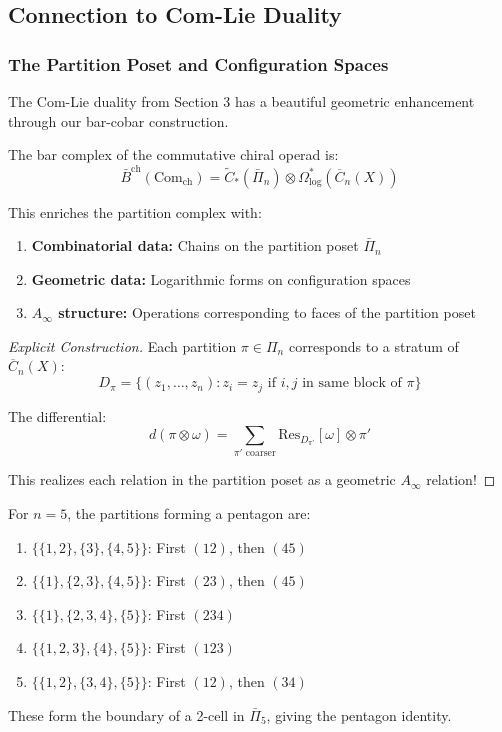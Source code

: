 \subsection{Connection to Com-Lie Duality}

\subsubsection{The Partition Poset and Configuration Spaces}

The Com-Lie duality from Section 3 has a beautiful geometric enhancement through our bar-cobar construction.

\begin{theorem}
The bar complex of the commutative chiral operad is:
$$\bar{B}^{\text{ch}}(\text{Com}_{\text{ch}}) = \tilde{C}_*(\bar{\Pi}_n) \otimes \Omega^*_{\text{log}}(\overline{C}_n(X))$$

This enriches the partition complex with:
\begin{enumerate}
\item \textbf{Combinatorial data:} Chains on the partition poset $\bar{\Pi}_n$
\item \textbf{Geometric data:} Logarithmic forms on configuration spaces
\item \textbf{$A_\infty$ structure:} Operations corresponding to faces of the partition poset
\end{enumerate}
\end{theorem}

\begin{proof}[Explicit Construction]
Each partition $\pi \in \Pi_n$ corresponds to a stratum of $\overline{C}_n(X)$:
$$D_\pi = \{(z_1, \ldots, z_n) : z_i = z_j \text{ if } i,j \text{ in same block of } \pi\}$$

The differential:
$$d(\pi \otimes \omega) = \sum_{\pi' \text{ coarser}} \text{Res}_{D_{\pi'}}[\omega] \otimes \pi'$$

This realizes each relation in the partition poset as a geometric $A_\infty$ relation!
\end{proof}

\begin{example}
For $n=5$, the partitions forming a pentagon are:
\begin{enumerate}
\item $\{\{1,2\},\{3\},\{4,5\}\}$: First $(12)$, then $(45)$
\item $\{\{1\},\{2,3\},\{4,5\}\}$: First $(23)$, then $(45)$
\item $\{\{1\},\{2,3,4\},\{5\}\}$: First $(234)$
\item $\{\{1,2,3\},\{4\},\{5\}\}$: First $(123)$
\item $\{\{1,2\},\{3,4\},\{5\}\}$: First $(12)$, then $(34)$
\end{enumerate}

These form the boundary of a 2-cell in $\bar{\Pi}_5$, giving the pentagon identity.
\end{example}

